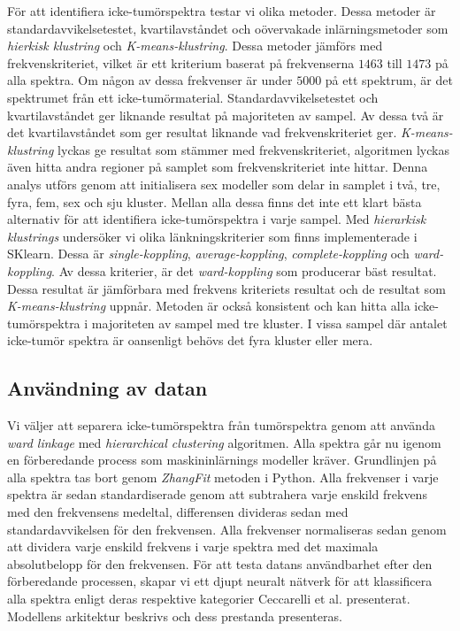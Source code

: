 För att identifiera icke-tumörspektra testar vi olika metoder. Dessa metoder är standardavvikelsetestet, kvartilavståndet och oövervakade inlärningsmetoder som \textit{hierkisk klustring} och \textit{K-means-klustring}. Dessa metoder jämförs med frekvenskriteriet, vilket är ett kriterium baserat på frekvenserna $1463$ till $1473$ på alla spektra. Om någon av dessa frekvenser är under $5000$ på ett spektrum, är det spektrumet från ett icke-tumörmaterial. Standardavvikelsetestet och kvartilavståndet ger liknande resultat på majoriteten av sampel. Av dessa två är det kvartilavståndet som ger resultat liknande vad frekvenskriteriet ger. \textit{K-means-klustring} lyckas ge resultat som stämmer med frekvenskriteriet, algoritmen lyckas även hitta andra regioner på samplet som frekvenskriteriet inte hittar. Denna analys utförs genom att initialisera sex modeller som delar in samplet i två, tre, fyra, fem, sex och sju kluster. Mellan alla dessa finns det inte ett klart bästa alternativ för att identifiera icke-tumörspektra i varje sampel. Med \textit{hierarkisk klustrings} undersöker vi olika länkningskriterier som finns implementerade i SKlearn. Dessa är \textit{single-koppling}, \textit{average-koppling}, \textit{complete-koppling} och \textit{ward-koppling}. Av dessa kriterier, är det \textit{ward-koppling} som producerar bäst resultat. Dessa resultat är jämförbara med frekvens kriteriets resultat och de resultat som \textit{K-means-klustring} uppnår. Metoden är också konsistent och kan hitta alla icke-tumörspektra i majoriteten av sampel med tre kluster. I vissa sampel där antalet icke-tumör spektra är oansenligt behövs det fyra kluster eller mera.

\subsection*{Användning av datan}

Vi väljer att separera icke-tumörspektra från tumörspektra genom att använda \textit{ward linkage} med \textit{hierarchical clustering} algoritmen. Alla spektra går nu igenom en förberedande process som maskininlärnings modeller kräver. Grundlinjen på alla spektra tas bort genom \textit{ZhangFit} metoden i Python. Alla frekvenser i varje spektra är sedan standardiserade genom att subtrahera varje enskild frekvens med den frekvensens medeltal, differensen divideras sedan med standardavvikelsen för den frekvensen. Alla frekvenser normaliseras sedan genom att dividera varje enskild frekvens i varje spektra med det maximala absolutbelopp för den frekvensen. För att testa datans användbarhet efter den förberedande processen, skapar vi ett djupt neuralt nätverk för att klassificera alla spektra enligt deras respektive kategorier Ceccarelli et al. \cite{cellsubsets} presenterat. Modellens arkitektur beskrivs och dess prestanda presenteras. 

